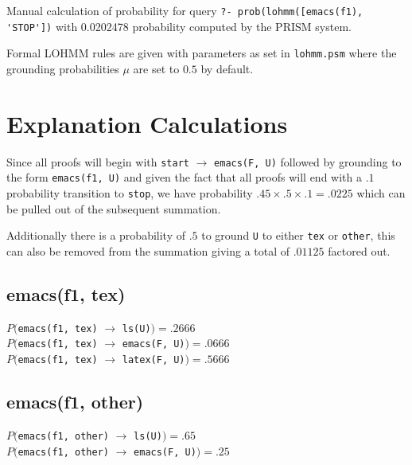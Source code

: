 \documentclass[11pt, oneside]{article}   	%
\title{}
\author{}
\date{}							%
\begin{document}

Manual calculation of probability for query \verb!?- prob(lohmm([emacs(f1), 'STOP'])! with 0.0202478 probability computed by the PRISM system.

Formal LOHMM rules are given with parameters as set in \verb!lohmm.psm! where the grounding probabilities $\mu$ are set to $0.5$ by default.

\section{Explanation Calculations}
Since all proofs will begin with \verb!start! $\rightarrow$ \verb!emacs(F, U)! followed by grounding to the form \verb!emacs(f1, U)! and given the fact that all proofs will end with a $.1$ probability transition to \verb!stop!, we have probability $.45 \times .5 \times .1 = .0225$ which can be pulled out of the subsequent summation.

Additionally there is a probability of $.5$ to ground \verb!U! to either \verb!tex! or \verb!other!, this can also be removed from the summation giving a total of $.01125$ factored out.

\subsection{emacs(f1, tex)}
$P($\verb!emacs(f1, tex)! $\rightarrow$ \verb!ls(U)!$) = .2666$\\
$P($\verb!emacs(f1, tex)! $\rightarrow$ \verb!emacs(F, U)!$) = .0666$\\
$P($\verb!emacs(f1, tex)! $\rightarrow$ \verb!latex(F, U)!$) = .5666$

\subsection{emacs(f1, other)}
$P($\verb!emacs(f1, other)! $\rightarrow$ \verb!ls(U)!$) = .65$\\
$P($\verb!emacs(f1, other)! $\rightarrow$ \verb!emacs(F, U)!$) = .25$\\
\end{document}
